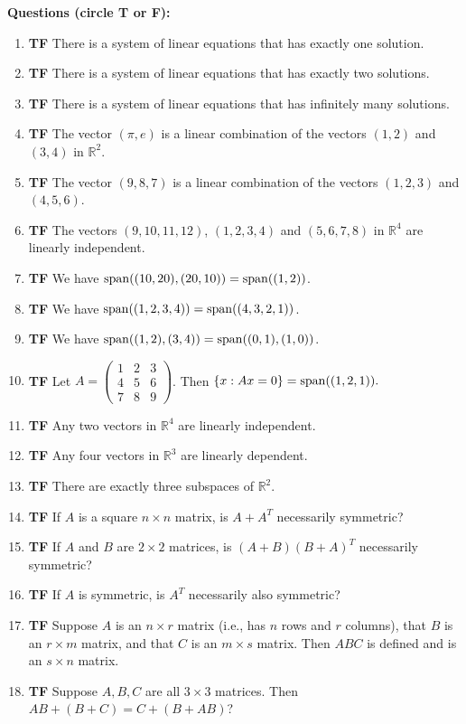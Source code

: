 \documentclass[11pt]{article}
\newcommand{\tf}[1]{\item {\bf {\color{blue}\hspace{1em}T\hspace{1em}F}}\hspace{1em} #1}
\begin{document}
{\noindent\bf \color{red} Questions (circle T or F):}
\begin{enumerate}

\tf{There is a system of linear equations that has exactly one solution.}

\tf{There is a system of linear equations that has exactly two solutions.}

\tf{There is a system of linear equations that has infinitely many solutions.}

\tf{The vector $(\pi,e)$ is a linear combination of the vectors $(1,2)$ and $(3,4)$ in $\mathbb{R}^2$.}

\tf{The vector $(9,8,7)$ is a linear combination of the vectors $(1,2,3)$ and $(4,5,6)$.}

\tf{The vectors $(9,10,11,12)$, $(1,2,3,4)$ and $(5,6,7,8)$ in $\mathbb{R}^4$ are linearly independent.}

\tf{We have ${\rm span}((10,20),(20,10)) = {\rm span}((1,2))$.}

\tf{We have ${\rm span}((1,2,3,4)) = {\rm span}((4,3,2,1))$.}

\tf{We have ${\rm span}((1,2),(3,4)) = {\rm span}((0,1),(1,0))$.}

\tf{Let $A=\left(\begin{array}{rrr}1 & 2 & 3 \\4 & 5 & 6 \\7 & 8 & 9\end{array}\right)$.  Then $\{ x : Ax=0 \} = {\rm span}((1,2,1)).$}

\tf{Any two vectors in $\mathbb{R}^{4}$ are linearly independent.}

\tf{Any four vectors in $\mathbb{R}^3$ are linearly dependent.}

\tf{There are exactly three subspaces of $\mathbb{R}^2$.}

\tf{If $A$ is a square $n\times n$ matrix, is $A + A^T$ necessarily symmetric?}

\tf{If $A$ and $B$ are $2\times 2$ matrices, is $(A+B)(B+A)^T$ necessarily symmetric?}

\tf{If $A$ is symmetric, is $A^T$ necessarily also symmetric?}

\tf{Suppose $A$ is an $n\times r$ matrix (i.e., has $n$ rows and $r$ columns), that $B$ is an $r\times m$ matrix, and that $C$ is an $m\times s$ matrix.  Then $ABC$ is defined and is an $s\times n$ matrix.}

\tf{Suppose $A,B,C$ are all $3\times 3$ matrices. Then  $AB + (B + C) = C + (B + AB)$?}


\end{enumerate}
\end{document}

